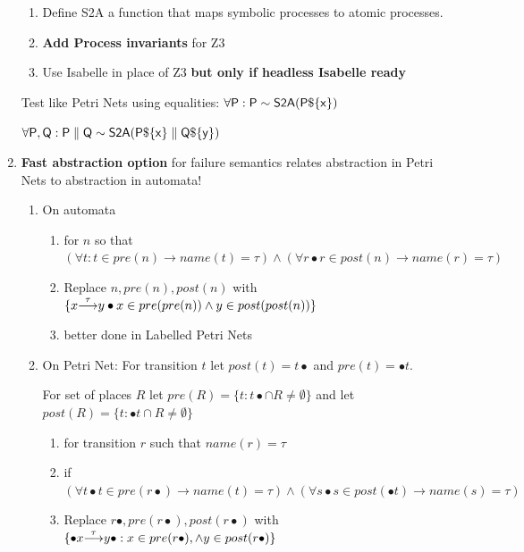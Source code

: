 \documentclass[]{article}
\begin{document}
\begin{enumerate}
\begin{enumerate}
\item Define {\sf S2A} a function that maps symbolic processes to atomic processes.

\item {\bf Add Process invariants} for Z3

\item Use Isabelle in place of Z3  {\bf but only if headless Isabelle ready}
\end{enumerate}
Test like Petri Nets using equalities: $\sf \forall {\sf P} : P  \sim  S2A(P\$\{x\})$ 

$\sf \forall {\sf P, Q} : P\parallel Q  \sim  S2A(P\$\{x\}\parallel Q\$\{y\})$



\item {\bf Fast abstraction option} for failure semantics relates abstraction in Petri Nets to abstraction in automata!
\begin{enumerate}
\item On automata
\begin{enumerate}
\item for $n$ so that $(\forall t: t \in pre(n) \rightarrow name(t)=\tau) \land (\forall r\bullet r\in post(n) \rightarrow name(r)=\tau)$
\item Replace $n,pre(n),post(n)$ with $\{{x}{\stackrel{\tau}{\longrightarrow}}{y}  \bullet x\in pre(pre(n))\land y\in post(post(n))\}$
\item better done in Labelled Petri Nets
\end{enumerate}
\item On Petri Net:  For transition  $t$ let  $post(t)= t\bullet $ and $pre(t)= \bullet t$.

   For set of places $R $ let $pre(R) = \{t: t\bullet \cap R \neq \emptyset\}$ and let $post(R) = \{t: \bullet t \cap R \neq \emptyset\}$

\begin{enumerate}
\item for transition $r$ such that $name(r) = \tau$ 

\item  \hspace{0.5cm} if $(\forall t\bullet t \in pre(r\bullet) \rightarrow name(t)=\tau) \land (\forall s\bullet s\in post(\bullet t) \rightarrow name(s)=\tau)$
\item \hspace{1cm} Replace $r\bullet, pre(r\bullet), post(r \bullet)$ with $\{{\bullet x}{\stackrel{\tau}{\longrightarrow}}{y\bullet}  : x\in pre(r\bullet),\land y\in post(r\bullet)\}$
\end{enumerate}
\end{enumerate}


\end{enumerate}
\end{document}
